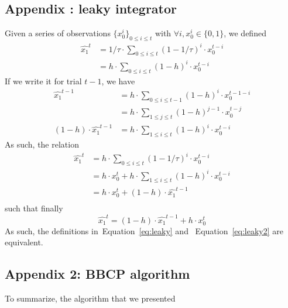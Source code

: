 \documentclass[12pt,english]{article}%
\newcommand{\eq}[1]{\begin{equation*}#1\end{equation*}}
\newcommand{\eqs}[1]{\begin{align*}#1\end{align*}}
\newcommand{\eqa}[1]{\begin{align}#1\end{align}}
\newcommand{\seeEq}[1]{Equation~\ref{eq:#1}}
\begin{document}
\subsection{Appendix : leaky integrator}
\label{app:leaky}
Given a series of observations $\{x_0^i\}_{0\leq i \leq t}$
with $\forall i, x_0^i \in \{0, 1 \}$, we defined
\eqs{
\hat{x_1}^{t} &= 1/\tau \cdot \sum_{0\leq i \leq t} (1 - 1/\tau)^{i} \cdot x_0^{t-i}\\
			  &= h \cdot \sum_{0\leq i \leq t} (1 - h)^{i} \cdot x_0^{t-i}
}
If we write it for trial $t-1$, we have
\eqs{
\hat{x_1}^{t-1}	&= h \cdot \sum_{0\leq i \leq t-1} (1 - h)^{i} \cdot x_0^{t-1-i} \\
                &= h \cdot \sum_{1\leq j \leq t} (1 - h)^{j-1} \cdot x_0^{t-j} \\ %
(1 - h) \cdot \hat{x_1}^{t-1} &= h \cdot \sum_{1\leq i \leq t} (1 - h)^{i} \cdot x_0^{t-i}
                }
As such, the relation
\eqs{
\hat{x_1}^{t}	&= h \cdot \sum_{0\leq i \leq t} (1 - 1/\tau)^{i} \cdot x_0^{t-i} \\
				&= h \cdot x_0^{t} + h \cdot \sum_{1\leq i \leq t} (1 - h)^{i} \cdot x_0^{t-i} \\
				&= h \cdot x_0^{t} + (1 - h) \cdot \hat{x_1}^{t-1} \\
}
such that finally
\eq{
\hat{x_1}^{t} = (1 - h) \cdot \hat{x_1}^{t-1} + h \cdot x_0^t
}
As such, the definitions in~\seeEq{leaky} and ~\seeEq{leaky2} are equivalent.
\subsection{Appendix 2: BBCP algorithm}
\label{app:bcp}



To summarize, the algorithm that we presented
%
%
%
%
\end{document}
